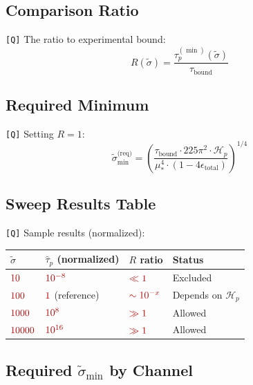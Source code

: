 \documentclass[11pt,a4paper]{article}
\newcommand{\Qval}[1]{\textcolor{red!70!black}{#1}}
\newcommand{\tagQ}{\textcolor{red!70!black}{\texttt{[Q]}}}
\theoremstyle{definition}
\begin{document}
\subsection{Comparison Ratio}
\label{app:ratio}

\tagQ{} The ratio to experimental bound:
\begin{equation}
\label{eq:ratio-sweep}
R(\tilde{\sigma}) = \frac{\tau_p^{(\min)}(\tilde{\sigma})}{\tau_{\text{bound}}}
\end{equation}

\subsection{Required Minimum}
\label{app:sigma-min}

\tagQ{} Setting $R = 1$:
\begin{equation}
\label{eq:sigma-min-solve}
\tilde{\sigma}_{\min}^{\text{(req)}} = \left(\frac{\tau_{\text{bound}} \cdot 225\pi^2 \cdot \mathcal{H}_p}{\mu_*^4 \cdot (1 - 4\epsilon_{\text{total}})}\right)^{1/4}
\end{equation}

\subsection{Sweep Results Table}
\label{app:sweep-table}

\tagQ{} Sample results (normalized):

\begin{center}
\begin{tabular}{llll}
\toprule
$\tilde{\sigma}$ & $\hat{\tau}_p$ (normalized) & $R$ ratio & Status \\
\midrule
$\Qval{10}$ & $\Qval{10^{-8}}$ & $\Qval{\ll 1}$ & Excluded \\
$\Qval{100}$ & $\Qval{1}$ (reference) & $\Qval{\sim 10^{-x}}$ & Depends on $\mathcal{H}_p$ \\
$\Qval{1000}$ & $\Qval{10^8}$ & $\Qval{\gg 1}$ & Allowed \\
$\Qval{10000}$ & $\Qval{10^{16}}$ & $\Qval{\gg 1}$ & Allowed \\
\bottomrule
\end{tabular}
\end{center}

\subsection{Required $\tilde{\sigma}_{\min}$ by Channel}
\label{app:min-by-channel}
\end{document}

